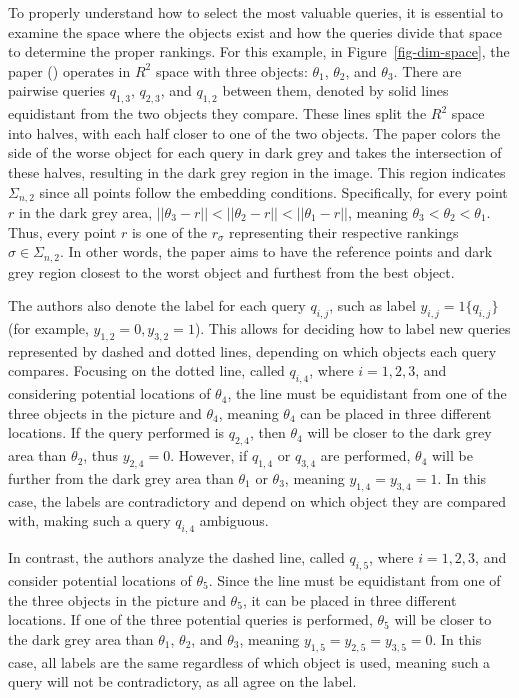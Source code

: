 \documentclass[
  letterpaper,
  numbers=noenddot,
  DIV=11]{scrreprt}
\theoremstyle{plain}
\theoremstyle{definition}
\theoremstyle{plain}
\theoremstyle{remark}
\begin{document}
To properly understand how to select the most valuable queries, it is
essential to examine the space where the objects exist and how the
queries divide that space to determine the proper rankings. For this
example, in Figure~\ref{fig-dim-space}, the paper
() operates in \(R^2\) space
with three objects: \(\theta_1\), \(\theta_2\), and \(\theta_3\). There
are pairwise queries \(q_{1,3}\), \(q_{2,3}\), and \(q_{1,2}\) between
them, denoted by solid lines equidistant from the two objects they
compare. These lines split the \(R^2\) space into halves, with each half
closer to one of the two objects. The paper colors the side of the worse
object for each query in dark grey and takes the intersection of these
halves, resulting in the dark grey region in the image. This region
indicates \(\Sigma_{n,2}\) since all points follow the embedding
conditions. Specifically, for every point \(r\) in the dark grey area,
\(||\theta_3 - r|| < ||\theta_2 - r|| < ||\theta_1 - r||\), meaning
\(\theta_3 < \theta_2 < \theta_1\). Thus, every point \(r\) is one of
the \(r_\sigma\) representing their respective rankings
\(\sigma \in \Sigma_{n,2}\). In other words, the paper aims to have the
reference points and dark grey region closest to the worst object and
furthest from the best object.

The authors also denote the label for each query \(q_{i,j}\), such as
label \(y_{i,j} = 1\{q_{i,j}\}\) (for example,
\(y_{1,2} = 0, y_{3,2} = 1\)). This allows for deciding how to label new
queries represented by dashed and dotted lines, depending on which
objects each query compares. Focusing on the dotted line, called
\(q_{i,4}\), where \(i={1,2,3}\), and considering potential locations of
\(\theta_4\), the line must be equidistant from one of the three objects
in the picture and \(\theta_4\), meaning \(\theta_4\) can be placed in
three different locations. If the query performed is \(q_{2,4}\), then
\(\theta_4\) will be closer to the dark grey area than \(\theta_2\),
thus \(y_{2,4} = 0\). However, if \(q_{1,4}\) or \(q_{3,4}\) are
performed, \(\theta_4\) will be further from the dark grey area than
\(\theta_1\) or \(\theta_3\), meaning \(y_{1,4} = y_{3,4} = 1\). In this
case, the labels are contradictory and depend on which object they are
compared with, making such a query \(q_{i,4}\) ambiguous.

In contrast, the authors analyze the dashed line, called \(q_{i,5}\),
where \(i={1,2,3}\), and consider potential locations of \(\theta_5\).
Since the line must be equidistant from one of the three objects in the
picture and \(\theta_5\), it can be placed in three different locations.
If one of the three potential queries is performed, \(\theta_5\) will be
closer to the dark grey area than \(\theta_1\), \(\theta_2\), and
\(\theta_3\), meaning \(y_{1,5} = y_{2,5} = y_{3,5} = 0\). In this case,
all labels are the same regardless of which object is used, meaning such
a query will not be contradictory, as all agree on the label.
\end{document}
